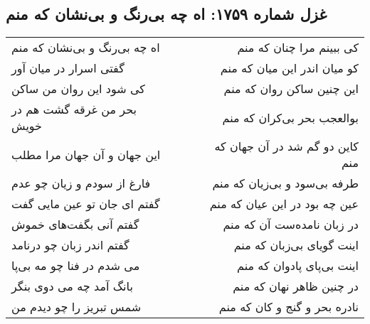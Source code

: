 \begin{center}
\section*{غزل شماره ۱۷۵۹: اه چه بی‌رنگ و بی‌نشان که منم}
\label{sec:1759}
\begin{longtable}{l p{0.5cm} r}
اه چه بی‌رنگ و بی‌نشان که منم
&&
کی ببینم مرا چنان که منم
\\
گفتی اسرار در میان آور
&&
کو میان اندر این میان که منم
\\
کی شود این روان من ساکن
&&
این چنین ساکن روان که منم
\\
بحر من غرقه گشت هم در خویش
&&
بوالعجب بحر بی‌کران که منم
\\
این جهان و آن جهان مرا مطلب
&&
کاین دو گم شد در آن جهان که منم
\\
فارغ از سودم و زیان چو عدم
&&
طرفه بی‌سود و بی‌زیان که منم
\\
گفتم ای جان تو عین مایی گفت
&&
عین چه بود در این عیان که منم
\\
گفتم آنی بگفت‌های خموش
&&
در زبان نامده‌ست آن که منم
\\
گفتم اندر زبان چو درنامد
&&
اینت گویای بی‌زبان که منم
\\
می شدم در فنا چو مه بی‌پا
&&
اینت بی‌پای پادوان که منم
\\
بانگ آمد چه می دوی بنگر
&&
در چنین ظاهر نهان که منم
\\
شمس تبریز را چو دیدم من
&&
نادره بحر و گنج و کان که منم
\\
\end{longtable}
\end{center}
